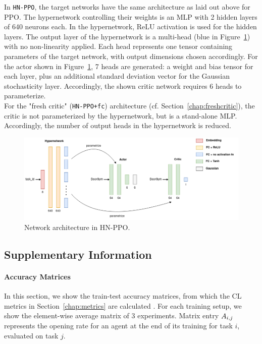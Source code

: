 \documentclass[dvipsnames]{article} %
\newcommand{\commentOLD}[1]{}
\newcommand{\psOLD}[1] {\commentOLD{{\color {purple} PS: #1}}}             %
\newcommand{\saOLD}[1] {\commentOLD{{\color{cyan} SA: #1}}}                %
\begin{document}
In \texttt{HN-PPO}, the target networks have the same architecture as laid out above for PPO. The hypernetwork controlling their weights is an MLP with 2 hidden layers of 640 \saOLD{or 64?} \psOLD{640 is correct, it's 10x the TN size} neurons each. In the hypernetwork, ReLU activation is used for the hidden layers. The output layer of the hypernetwork is a multi-head (blue in Figure~\ref{hnet-arch}) with no non-linearity applied. Each head represents one tensor containing parameters of the target network, with output dimensions chosen accordingly. For the actor shown in Figure~\ref{hnet-arch}, 7 heads are generated: a weight and bias tensor for each layer, plus an additional standard deviation vector for the Gaussian stochasticity layer. Accordingly, the shown critic network requires 6 heads to parameterize.\\
For the "fresh critic" (\texttt{HN-PPO+fc}) architecture (cf. Section~\ref{chap:freshcritic}), the critic is not parameterized by the hypernetwork, but is a stand-alone MLP. Accordingly, the number of output heads in the hypernetwork is reduced.

\saOLD{I think this can be moved into the methods section.} \psOLD{Is here because it's one of the first things to go if I exceed the length. Will move depending on space requirements at the end}

\begin{figure}[htbp]
\begin{center}
\includegraphics[width=0.8\linewidth]{images/hnet_arch.png}
\end{center}
\caption{Network architecture in HN-PPO.}
\label{hnet-arch}
\end{figure}

\subsection{Supplementary Information}
\paragraph{Accuracy Matrices}
In this section, we show the train-test accuracy matrices, from which the CL metrics in Section~\ref{chap:metrics} are calculated \citep{moreThanForgetting}. For each training setup, we show the element-wise average matrix of 3 experiments. Matrix entry ${A}_{i,j}$ represents the opening rate for an agent at the end of its training for task $i$, evaluated on task $j$. 
\end{document}
